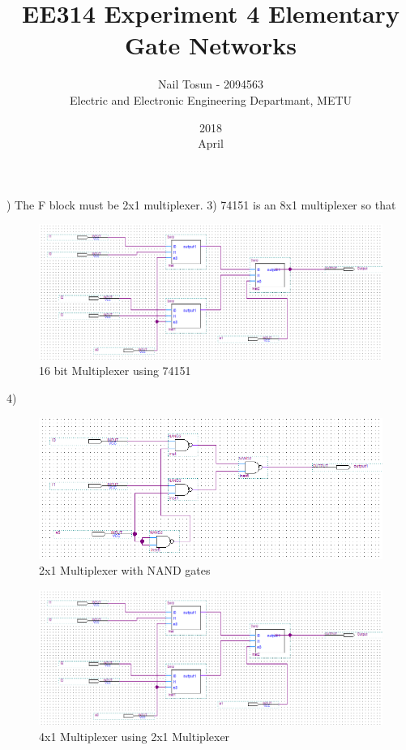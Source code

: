 \documentclass[11pt]{report}
\title{EE314 Experiment 4 Elementary Gate Networks}
\date{2018\\ April}
\author{Nail Tosun - 2094563\\ Electric and Electronic Engineering Departmant, METU}
\begin{document}
)
The F block must be 2x1 multiplexer. 
3)
74151 is an 8x1 multiplexer so that
\begin{figure}[H]
  \includegraphics[width=\linewidth]{2x1}
  \caption{16 bit Multiplexer using 74151}
  \label{fig:zero}
\end{figure}  
4)
\begin{figure}[H]
  \includegraphics[width=\linewidth]{a}
  \caption{2x1 Multiplexer with NAND gates}
  \label{fig:zero}
\end{figure} 

\begin{figure}[H]
  \includegraphics[width=\linewidth]{2x1}
  \caption{4x1 Multiplexer using 2x1 Multiplexer}
  \label{fig:zero}
\end{figure} 
\end{document}
